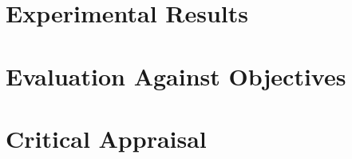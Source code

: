 
\section{Experimental Results}

\section{Evaluation Against Objectives}

\section{Critical Appraisal}